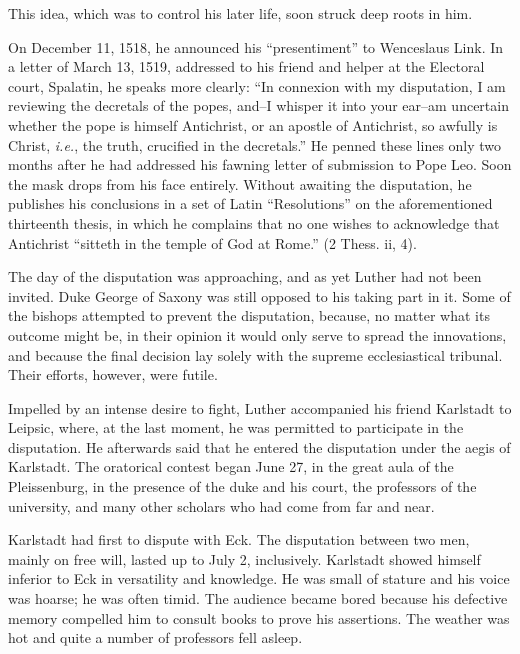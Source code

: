 This idea, which was to control his later life, soon struck deep roots
in him.

On December 11, 1518, he announced his “presentiment” to Wenceslaus
Link. In a letter of March 13, 1519, addressed to his friend and
helper at the Electoral court, Spalatin, he speaks more clearly: “In
connexion with my disputation, I am reviewing the decretals of the
popes, and--I whisper it into your ear--am uncertain whether the
pope is himself Antichrist, or an apostle of Antichrist, so awfully is
Christ, \textit{i.e.}, the truth, crucified in the decretals.” He penned these
lines only two months after he had addressed his fawning letter of
submission to Pope Leo. Soon the mask drops from his face entirely.
Without awaiting the disputation, he publishes his conclusions in a
set of Latin “Resolutions” on the aforementioned thirteenth thesis, in
which he complains that no one wishes to acknowledge that Antichrist
“sitteth in the temple of God at Rome.” (2 Thess. ii, 4).

The day of the disputation was approaching, and as yet Luther had
not been invited. Duke George of Saxony was still opposed to his
taking part in it. Some of the bishops attempted to prevent the disputation,
because, no matter what its outcome might be, in their opinion
it would only serve to spread the innovations, and because the final
decision lay solely with the supreme ecclesiastical tribunal. Their
efforts, however, were futile.

Impelled by an intense desire to fight,
Luther accompanied his friend Karlstadt to Leipsic, where, at the
last moment, he was permitted to participate in the disputation.
He afterwards said that he entered the disputation under the aegis
of Karlstadt. The oratorical
contest began June 27, in the great aula of the Pleissenburg, in the
presence of the duke and his court, the professors of the university,
and many other scholars who had come from far and near.

Karlstadt had first to dispute with Eck. The disputation between
two men, mainly on free will, lasted up to July 2, inclusively.
Karlstadt showed himself inferior to Eck in versatility and knowledge.
He was small of stature and his voice was hoarse; he was often
timid. The audience became bored because his defective memory
compelled him to consult books to prove his assertions. The weather
was hot and quite a number of professors fell asleep.


